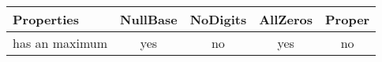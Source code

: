 \documentclass[\main/thesis.tex]{subfiles}
\begin{document}
\begin{center}
    \begin{adjustbox}{max width=\textwidth}
    \begin{tabular}{ | l | c | c | c | c | }
    \textbf{Properties} & \textbf{NullBase} & \textbf{NoDigits} & \textbf{AllZeros} & \textbf{Proper} \\
    \hline
    has an maximum & yes & no & yes & no \\
    \end{tabular}
    \end{adjustbox}
\end{center}


%
%
%
%
%
%
%
%
%
%
\end{document}
